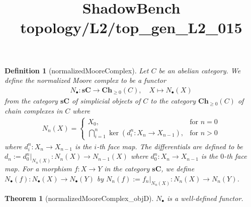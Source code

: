 \documentclass{article}
\title{ShadowBench topology/L2/top\_gen\_L2\_015}
\newtheorem{theorem}{Theorem}
\newtheorem{definition}{Definition}
\begin{document}
\maketitle

\begin{definition}[normalizedMooreComplex]
Let $C$ be an abelian category. We define the normalized Moore complex to be a functor
\begin{align*}
    N_\bullet: \mathbf{sC} \to \mathbf{Ch}_{\ge 0}(C), \quad X \mapsto N_\bullet(X)
\end{align*}
from the category $\mathbf{sC}$ of simplicial objects of $C$ to the category $\mathbf{Ch}_{\ge 0}(C)$ of chain complexes in $C$ where
\begin{align*}
    N_n(X) = \begin{cases}
        X_0, &\text{for $n=0$}\\
        \bigcap_{i=1}^n \ker (d_i^n:X_n \to X_{n-1}), &\text{for $n > 0$}
    \end{cases}
\end{align*}
where $d_i^n:X_n \to X_{n-1}$ is the $i$-th face map. The differentials are defined to be $d_n := d_0^n|_{N_n(X)}:N_n(X) \to N_{n-1}(X)$ where $d_0^n:X_n \to X_{n-1}$ is the $0$-th face map. For a morphism $f:X \to Y$ in the category $\mathbf{sC}$, we define $N_\bullet(f):N_\bullet(X) \to N_\bullet(Y)$ by $N_n(f):=f_n|_{N_n(X)}:N_n(X) \to N_n(Y)$.
\end{definition}
\begin{theorem}[normalizedMooreComplex_objD]
    $N_\bullet$ is a well-defined functor.
\end{theorem}
\end{document}
